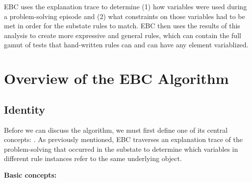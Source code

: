 EBC uses the explanation trace to determine (1) how variables were used during a problem-solving episode and (2) what constraints on those variables had to be met in order for the substate rules to match.  EBC then uses the results of this analysis to create more expressive and general rules, which can contain the full gamut of tests that hand-written rules can and can have any element variablized.


\section{Overview of the EBC Algorithm}
\label{CHUNKING-ebc}

\subsection{Identity}

Before we can discuss the algorithm, we must first define one of its central concepts: .  As previously mentioned, EBC traverses an explanation trace of the problem-solving that occurred in the substate to determine which variables in different rule instances refer to the same underlying object.  

\textbf{Basic concepts:}

